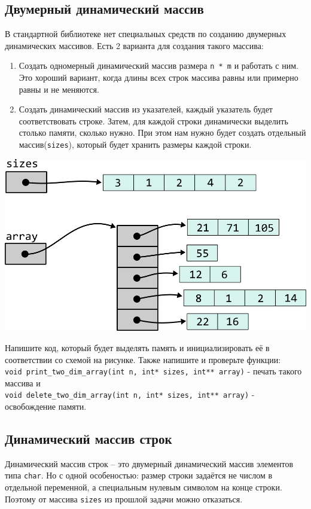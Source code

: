 \documentclass{article}
\begin{document}
\subsection{Двумерный динамический массив}
В стандартной библиотеке нет специальных средств по созданию
двумерных динамических массивов. Есть 2 варианта для создания
такого массива:
\begin{enumerate}
\item Создать одномерный динамический массив размера \texttt{n * m} и работать с ним.
Это хороший вариант, когда длины всех строк массива равны или примерно равны и не меняются.
\item Создать динамический массив из указателей, каждый указатель будет 
соответствовать строке. Затем, для каждой строки динамически выделить столько памяти,
сколько нужно. При этом нам нужно будет создать отдельный массив(\texttt{sizes}), который будет хранить
размеры каждой строки.
\end{enumerate}
\begin{center}
\includegraphics[scale=1]{../images/pointer_schemes/two_dim_dynamic_array.png}
\end{center}
Напишите код, который будет выделять память и инициализировать её в соответствии 
со схемой на рисунке. Также напишите и проверьте функции: \\
\texttt{void print\_two\_dim\_array(int n, int* sizes, int** array)} - печать такого массива и\\
\texttt{void delete\_two\_dim\_array(int n, int* sizes, int** array)} - освобождение памяти.

\subsection{Динамический массив строк}
Динамический массив строк -- это двумерный динамический массив элементов типа \texttt{char}. 
Но с одной особеностью: размер строки задаётся не числом в отдельной переменной, 
а специальным нулевым символом на конце строки. Поэтому от массива \texttt{sizes}
из прошлой задачи можно отказаться.\\
\end{document}
